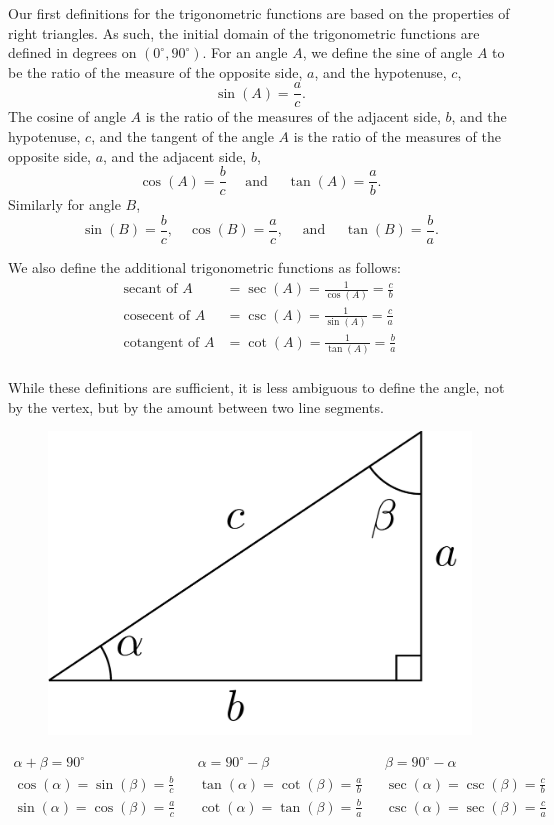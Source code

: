 \documentclass[
]{book}
\theoremstyle{definition}
\theoremstyle{definition}
\theoremstyle{definition}
\theoremstyle{remark}
\begin{document}
Our first definitions for the trigonometric functions are based on the properties of right triangles. As such, the initial domain of the trigonometric functions are defined in degrees on \((0^\circ,90^\circ)\). For an angle \(A\), we define the sine of angle \(A\) to be the ratio of the measure of the opposite side, \(a\), and the hypotenuse, \(c\),
\[\sin(A) = \frac{a}{c}.\]
The cosine of angle \(A\) is the ratio of the measures of the adjacent side, \(b\), and the hypotenuse, \(c\), and the tangent of the angle \(A\) is the ratio of the measures of the opposite side, \(a\), and the adjacent side, \(b\),
\[\cos(A) = \frac{b}{c} \quad  \mbox{ and } \quad \tan(A) = \frac{a}{b}.\]
Similarly for angle \(B\),
\[\sin(B) = \frac{b}{c}, \quad \cos(B) = \frac{a}{c}, \quad \mbox{ and } \quad \tan(B) = \frac{b}{a}.\]

We also define the additional trigonometric functions as follows:
\begin{align*}
\mbox{secant of }A &= \sec(A) = \frac{1}{\cos(A)} = \frac{c}{b} \\
\mbox{cosecent of }A &= \csc(A) = \frac{1}{\sin(A)} = \frac{c}{a} \\
\mbox{cotangent of } A &= \cot(A) = \frac{1}{\tan(A)} = \frac{b}{a} \\
\end{align*}

While these definitions are sufficient, it is less ambiguous to define the angle, not by the vertex, but by the amount between two line segments.

\begin{figure}

{\centering \includegraphics[width=0.3\linewidth]{tikz/right-triangle-trig2} 

}

\end{figure}

\begin{align*}
\alpha + \beta = 90^\circ & & \alpha = 90^\circ - \beta & & \beta=90^\circ - \alpha  \\
\cos(\alpha) = \sin(\beta) =  \frac{b}{c} & & \tan(\alpha) = \cot(\beta) = \frac{a}{b} & & \sec(\alpha) = \csc(\beta) = \frac{c}{b}\\
\sin(\alpha) = \cos(\beta) = \frac{a}{c} & & \cot(\alpha) = \tan(\beta) = \frac{b}{a} & & \csc(\alpha) = \sec(\beta) = \frac{c}{a} \\
\end{align*}
\end{document}
